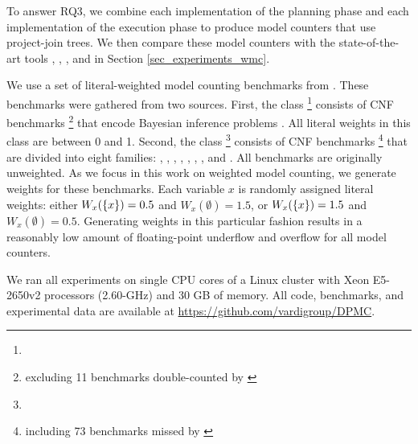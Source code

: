 To answer RQ3, we combine each implementation of the planning phase and each implementation of the execution phase to produce model counters that use project-join trees.
We then compare these model counters with the state-of-the-art tools \cachet{} \cite{sang2004combining}, \ctd{} \cite{darwiche2004new}, \df{} \cite{LM17}, and \minictd{} \cite{OD15} in Section \ref{sec_experiments_wmc}.

We use a set of \benchmarkCountAltogether{} literal-weighted model counting benchmarks from \cite{DPV20}.
These benchmarks were gathered from two sources.
First, the \classBayes{} class%
\footnote{\urlBenchmarksBayes}
consists of \benchmarkCountBayes{} CNF benchmarks%
\footnote{excluding 11 benchmarks double-counted by \cite{DPV20}}
that encode Bayesian inference problems \cite{sang2005performing}.
All literal weights in this class are between 0 and 1. %
Second, the \classOther{} class%
\footnote{\urlBenchmarksOther}
consists of \benchmarkCountOther{} CNF benchmarks%
\footnote{including 73 benchmarks missed by \cite{DPV20}}
that are divided into eight families: \famBmc, \famCircuit, \famConfig, \famHandmade, \famPlanning, \famQif, \famRandom, and \famSchedule{} \cite{clarke2001bounded,sinz2003formal,palacios2009compiling,klebanov2013sat}.
All \classOther{} benchmarks are originally unweighted.
As we focus in this work on weighted model counting, we generate weights for these benchmarks.
Each variable $x$ is randomly assigned literal weights: either $W_x(\left\{ x \right\}) = 0.5$ and $W_x(\emptyset) = 1.5$, or $W_x(\left\{ x \right\}) = 1.5$ and $W_x(\emptyset) = 0.5$.
Generating weights in this particular fashion results in a reasonably low amount of floating-point underflow and overflow for all model counters.

We ran all experiments on single CPU cores of a Linux cluster with Xeon E5-2650v2 processors (2.60-GHz) and 30 GB of memory.
All code, benchmarks, and experimental data are available at \url{https://github.com/vardigroup/DPMC}.


